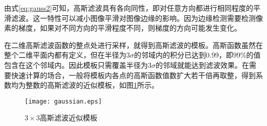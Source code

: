 由式\eqref{eq:gauss2}可知，高斯滤波具有各向同性，即对任意方向都进行相同程度的平滑滤波。这一特性可以减小图像平滑对图像边缘的影响。因为边缘检测需要检测像素的梯度，如果对不同方向的平滑程度不同，则梯度的方向可能发生变化。

在二维高斯滤波函数的整点处进行采样，就得到高斯滤波的模板。高斯函数虽然在整个二维平面内都有定义，但在半径为$3\sigma$的邻域内的积分已达到0.99，即99\%的值包含在这个邻域内。因此模板只需覆盖半径为$3\sigma$的邻域就能达到滤波效果。在需要快速计算的场合，一般将模板内各点的高斯函数值数扩大若干倍再取整，得到系数均为整数的高斯滤波的近似模板，如图\ref{fig:gaussian}所示。
\begin{figure}[!h]
  \centering
  \texttt{[image: gaussian.eps]}
  \caption{$3\times 3$高斯滤波近似模板}
  \label{fig:gaussian}
\end{figure}




